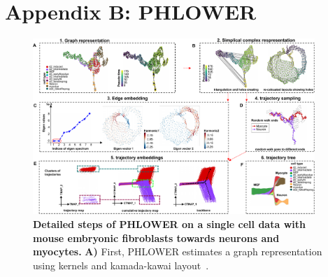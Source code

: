 \chapter{Appendix B: PHLOWER}
\label{chapter:appendixB}


\graphicspath{{appendix/figs}}

\begin{figure}[!ht]
  \centering
  \includegraphics[width=0.95\textwidth]{Fib2Neuron_PHLOWER/fig}
  \vspace{0.1cm}
  \caption[Fibroblasts to Neurons dataset PHLOWER workflow.]{\textbf{Detailed steps of PHLOWER on a single cell data with mouse embryonic fibroblasts towards neurons and myocytes.} \textbf{A)} First, PHLOWER estimates a graph representation using kernels and kamada-kawai layout~\citep{gansner2004graph}.
}
\end{figure}
